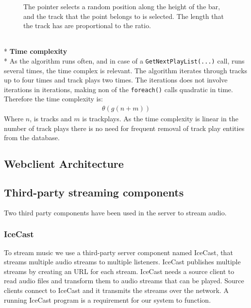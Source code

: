 \documentclass[a4paper,11pt,report]{article}
\begin{document}
{\begin{figure}[htp]
\caption{The pointer selects a random position along the height of the bar, and the track that the point belongs to is selected. The length that the track has are proportional to the ratio.}
\end{figure}
\textbf{ } \\*
\textbf{Time complexity} \\*
As the algorithm runs often, and in case of a \texttt{GetNextPlayList(...)} call, runs several times, the time complex is relevant. The algorithm iterates through tracks up to four times and track plays two times. The iterations does not involve iterations in iterations, making non of the \texttt{foreach()} calls quadratic in time. Therefore the time complexity is: 
\begin{align*}
\theta (g(n + m))
\end{align*}
Where \begin{math}n\end{math}, is tracks and \begin{math}m\end{math} is trackplays. As the time complexity is linear in the number of track plays there is no need for frequent removal of track play entities from the database.

\subsection{Webclient Architecture}

\subsection{Third-party streaming components}
Two third party components have been used in the server to stream audio.
\subsubsection{IceCast}
To stream music we use a third-party server component named IceCast\cite{IceCast}, that streams multiple audio streams to multiple listeners. IceCast publishes multiple streams by creating an URL for each stream. IceCast needs a source client to read audio files and transform them to audio streams that can be played. Source clients connect to IceCast and it transmits the streams over the network. A running IceCast program is a requirement for our system to function.
}
\end{document}
